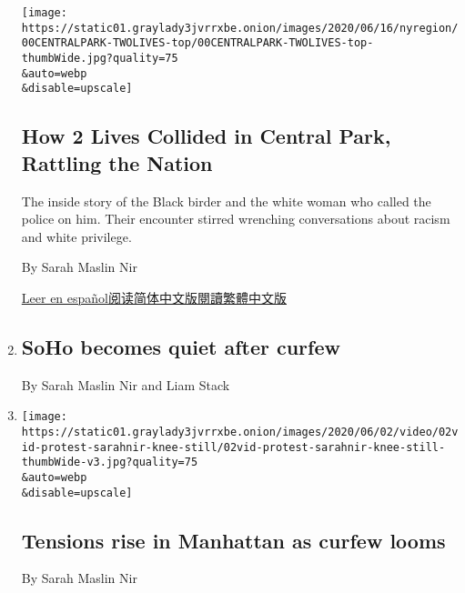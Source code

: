 \begin{enumerate}
  \texttt{[image: https://static01.graylady3jvrrxbe.onion/images/2020/06/16/nyregion/00CENTRALPARK-TWOLIVES-top/00CENTRALPARK-TWOLIVES-top-thumbWide.jpg?quality=75\\\&auto=webp\\\&disable=upscale]}

  \hypertarget{how-2-lives-collided-in-central-park-rattling-the-nation}{%
  \subsection{How 2 Lives Collided in Central Park, Rattling the
  Nation}\label{how-2-lives-collided-in-central-park-rattling-the-nation}}

  The inside story of the Black birder and the white woman who called
  the police on him. Their encounter stirred wrenching conversations
  about racism and white privilege.

  By Sarah Maslin Nir

  \href{https://www.nytimes3xbfgragh.onion/es/2020/06/15/espanol/central-park-racismo-amy-cooper.html}{Leer
  en
  español}\href{https://cn.nytimes3xbfgragh.onion/usa/20200617/central-park-amy-cooper-christian-racism/}{阅读简体中文版}\href{https://cn.nytimes3xbfgragh.onion/usa/20200617/central-park-amy-cooper-christian-racism/zh-h}{閱讀繁體中文版}
\item
  \href{/live/2020/protests-george-floyd-police-06-02/soho-becomes-quiet-after-curfew}{}

  \hypertarget{soho-becomes-quiet-after-curfew}{%
  \subsection{SoHo becomes quiet after
  curfew}\label{soho-becomes-quiet-after-curfew}}

  By Sarah Maslin Nir and Liam Stack
\item
  \href{/live/2020/protests-george-floyd-police-06-02/tensions-rise-in-manhattan-as-curfew-looms}{}

  \texttt{[image: https://static01.graylady3jvrrxbe.onion/images/2020/06/02/video/02vid-protest-sarahnir-knee-still/02vid-protest-sarahnir-knee-still-thumbWide-v3.jpg?quality=75\\\&auto=webp\\\&disable=upscale]}

  \hypertarget{tensions-rise-in-manhattan-as-curfew-looms}{%
  \subsection{Tensions rise in Manhattan as curfew
  looms}\label{tensions-rise-in-manhattan-as-curfew-looms}}

  By Sarah Maslin Nir
\end{enumerate}

